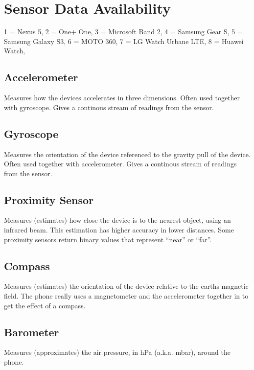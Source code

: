 
\section{Sensor Data Availability}
\label{sec:sensor_data_availability}
1 = Nexus 5,
2 = One+ One,
3 = Microsoft Band 2,
4 = Samsung Gear S,
5 = Samsung Galaxy S3,
6 = MOTO 360,
7 = LG Watch Urbane LTE,
8 = Huawei Watch,



\subsection{Accelerometer}
\label{sub:accelerometer}
Measures how the devices accelerates in three dimensions. Often used together with gyroscope. Gives a continous stream of readings from the sensor.

\subsection{Gyroscope}
\label{sub:gyroscope}
Measures the orientation of the device referenced to the gravity pull of the device. Often used together with accelerometer. Gives a continous stream of readings from the sensor.

\subsection{Proximity Sensor}
\label{sub:proximity_sensor}
Measures (estimates) how close the device is to the nearest object, using an infrared beam. This estimation has higher accuracy in lower distances. Some proximity sensors return binary values that represent ``near'' or ``far''.

\subsection{Compass}
\label{sub:compass}
Measures (estimates) the orientation of the device relative to the earths magnetic field. The phone really uses a magnetometer and the accelerometer together in to get the effect of a compass. 

\subsection{Barometer}
\label{sub:barometer}
Measures (approximates) the air pressure, in hPa (a.k.a. mbar), around the phone.

